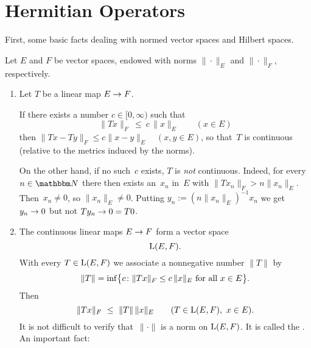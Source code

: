 \documentclass[main.tex]{subfiles}
\begin{document}
\section{Hermitian Operators}
First, some basic facts dealing 
with normed vector spaces and Hilbert spaces.
%
%
\begin{psec}{5.1}%
Let $E$ and $F$ be vector spaces,
endowed with norms $\|\cdot\|_E$ and $\|\cdot\|_F$, respectively.
\begin{enumerate}
\item \label{5.1-1}
Let $T$ be a linear map $E\rightarrow F$.

If there exists a number $c\in [0,\infty)$ such that
\begin{equation*}
\|Tx\|_F \ \leq \ c\,\|x\|_E \qquad (x\in E)
\end{equation*}
then $\|Tx-Ty\|_F \leq c\|x-y\|_E\quad (x,y\in E)$,
so that~$T$ is continuous
(relative to the metrics induced by the norms).

On the other hand,
if no such~$c$ exists,
$T$ is \emph{not} continuous.
Indeed,
for every $n\in\N$
there then exists an~$x_n$ in~$E$
with $\|T x_n\|_F > n \|x_n\|_E$.
Then~$x_n\neq 0$, so $\|x_n\|_E\neq 0$.
Putting $y_n:=(n\|x_n\|_E)^{-1}x_n$
we get $y_n\rightarrow 0$
but not $Ty_n\rightarrow 0=T0$.
%
\item \label{5.1-2}
The continuous linear maps $E\rightarrow F$ form a vector space
\begin{equation*}
\mathrm{L}(E,F)\text{.}
\end{equation*}
With every $T\in\mathrm{L}(E,F)$ 
we associate a nonnegative number $\| T \|$ by
\begin{equation*}
\|T\| = \inf \bigl\{ c\colon 
\|Tx\|_F \leq c\,\|x\|_E\text{ for all }x\in E\bigr\}\text{.}
\end{equation*}
Then
\begin{equation*}
\|Tx\|_F\ \leq\ \|T\|\,\|x\|_E \qquad (T\in\mathrm{L}(E,F),\ x\in E)\text{.}
\end{equation*}
It is not difficult to verify
that~$\|\cdot\|$ is a norm on $\mathrm{L}(E,F)$.
It is called the .
An important fact:
\end{enumerate}
\end{psec}
%
%
\end{document}
